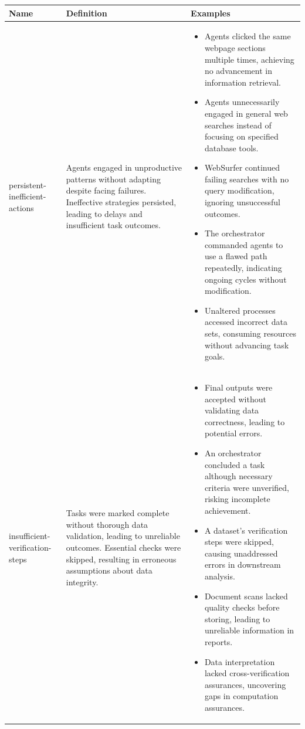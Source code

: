 \begin{longtable}{p{} p{} p{}}
\hline
\textbf{Name} & \textbf{Definition} & \textbf{Examples} \\
\hline
persistent-inefficient-actions &
Agents engaged in unproductive patterns without adapting despite facing failures. Ineffective strategies persisted, leading to delays and insufficient task outcomes. &
\begin{itemize}
  \item Agents clicked the same webpage sections multiple times, achieving no advancement in information retrieval.
  \item Agents unnecessarily engaged in general web searches instead of focusing on specified database tools.
  \item WebSurfer continued failing searches with no query modification, ignoring unsuccessful outcomes.
  \item The orchestrator commanded agents to use a flawed path repeatedly, indicating ongoing cycles without modification.
  \item Unaltered processes accessed incorrect data sets, consuming resources without advancing task goals.
\end{itemize}
\\ \hline

insufficient-verification-steps &
Tasks were marked complete without thorough data validation, leading to unreliable outcomes. Essential checks were skipped, resulting in erroneous assumptions about data integrity. &
\begin{itemize}
  \item Final outputs were accepted without validating data correctness, leading to potential errors.
  \item An orchestrator concluded a task although necessary criteria were unverified, risking incomplete achievement.
  \item A dataset's verification steps were skipped, causing unaddressed errors in downstream analysis.
  \item Document scans lacked quality checks before storing, leading to unreliable information in reports.
  \item Data interpretation lacked cross-verification assurances, uncovering gaps in computation assurances.
\end{itemize}
\\ \hline


\end{longtable}
